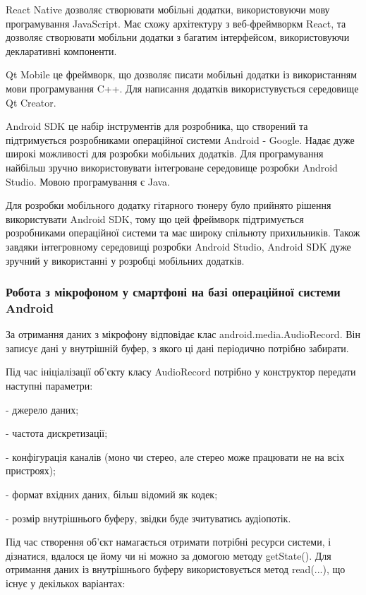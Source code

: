 React Native дозволяє створювати мобільні додатки, використовуючи мову програмування JavaScript. Має схожу архітектуру з веб-фреймворкм React, та дозволяє створювати мобільни додатки з багатим інтерфейсом, використовуючи декларативні компоненти. \cite{react-native}

Qt Mobile це фреймворк, що дозволяє писати мобільні додатки із використанням мови програмування C++. Для написання додатків використувується середовище Qt Creator. \cite{qt-mobile}

Android SDK це набір інструментів для розробника, що створений та підтримується розробниками операційної системи Android - Google. Надає дуже широкі можливості для розробки мобільних додатків. Для програмування найбільш зручно використовувати інтегроване середовище розробки Android Studio. Мовою програмування є Java.
\cite{androiddevelopers} 

Для розробки мобільного додатку гітарного тюнеру було прийнято рішення використувати Android SDK, тому що цей фреймворк підтримується розробниками операційної системи та має широку спільноту прихильників. Також завдяки інтегровному середовищі розробки Android Studio, Android SDK дуже зручний у використанні у розробці мобільних додатків.

\subsubsection{Робота з мікрофоном у смартфоні на базі операційної системи Android}

За отримання даних з мікрофону відповідає клас android.media.AudioRecord. Він записує дані у внутрішній буфер, з якого ці дані періодично потрібно забирати.

Під час ініціалізації об'єкту класу AudioRecord потрібно у конструктор передати наступні параметри:

- джерело даних;

- частота дискретизації;

- конфігурація каналів (моно чи стерео, але стерео може працювати не на всіх 
пристроях);

- формат вхідних даних, більш відомий як кодек;

- розмір внутрішнього буферу, звідки буде зчитуватись аудіопотік.

Під час створення об'єкт намагається отримати потрібні ресурси системи, і дізнатися, вдалося це йому чи ні можно за домогою методу getState(). Для отримання даних із внутрішнього буферу використовується метод read(...), що існує у декількох варіантах:

